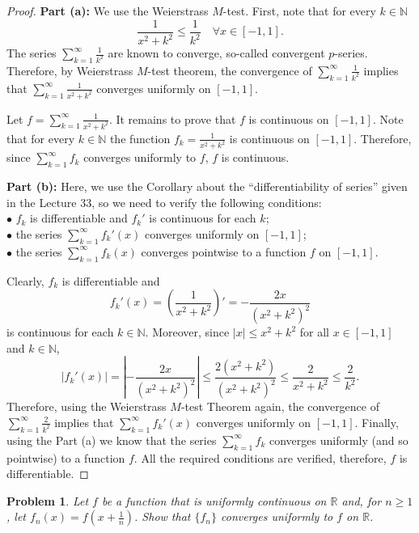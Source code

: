 \documentclass[11pt]{article}
\theoremstyle{plain}
\newtheorem{problem}{Problem}
\theoremstyle{remark}
\newcommand {\mbR} {\mathbb R}
\newcommand {\mbN} {\mathbb N}
\begin{document}
\begin{proof}
	{\bf Part (a):} We use the Weierstrass $M$-test. First, note that for every 
	$k \in \mbN$
	$$
	\frac{1}{x^2+k^2} \leq \frac{1}{k^2} \quad \forall x \in [-1,1].
	$$
	The series $\sum_{k=1}^\infty \frac{1}{k^2}$ are known to converge, so-called convergent $p$-series. Therefore, by Weierstrass $M$-test theorem, the convergence of $\sum_{k=1}^\infty \frac{1}{k^2}$ implies that $\sum_{k=1}^\infty \frac{1}{x^2+k^2}$ converges uniformly on $[-1,1]$. 
	
	Let $f = \sum_{k=1}^\infty \frac{1}{x^2+k^2}$. It remains to prove that $f$ is continuous on $[-1,1]$. Note that for every $k \in \mbN$ the function $f_k =  \frac{1}{x^2+k^2}$ is continuous on $[-1,1]$. Therefore, since 
	$\sum_{k=1}^\infty f_k$ converges uniformly to $f$, $f$ is continuous.
	
	{\bf Part (b):} Here, we use the Corollary about the ``differentiability of series'' given in the Lecture 33, so we need to verify the following conditions:\\
	$\bullet$ $f_k$ is differentiable and $f_k'$ is continuous for each $k$;\\
	$\bullet$ the series $\sum_{k=1}^\infty f_k'(x)$ converges uniformly on $[-1,1]$; \\
	$\bullet$ the series $\sum_{k=1}^\infty f_k(x)$ converges pointwise to a function $f$ on $[-1,1]$.
	
	Clearly, $f_k$ is differentiable and 
	$$
	f_k'(x) = \left(\frac{1}{x^2+k^2} \right)' = -\frac{2x}{(x^2+k^2)^2}
	$$
	is continuous for each $k \in \mbN$. Moreover, since $|x| \leq x^2+k^2$ for all $x \in [-1,1]$ and $k \in \mbN$, 
	$$
	|f_k'(x)| = \left| -\frac{2x}{(x^2+k^2)^2}\right| \leq \frac{2(x^2+k^2)}{(x^2+k^2)^2} \leq \frac{2}{x^2+k^2} \leq \frac{2}{k^2}.
	$$
	Therefore, using the Weierstrass $M$-test Theorem again, the convergence of $\sum_{k=1}^\infty \frac{2}{k^2}$ implies that $\sum_{k=1}^\infty f_k'(x)$ converges uniformly on $[-1,1]$. Finally, using the Part (a) we know that the series $\sum_{k=1}^\infty f_k$ converges uniformly (and so pointwise) to a function $f$.  All the required conditions are verified, therefore, $f$ is differentiable.
\end{proof}

\begin{problem}
	Let $f$ be a function that is uniformly continuous on $\mbR$ and, for $n \geq 1$, let $f_n(x) = f(x+\frac{1}{n})$. Show that $\{f_n\}$ converges uniformly to $f$ on $\mbR$.
\end{problem}
\end{document}

